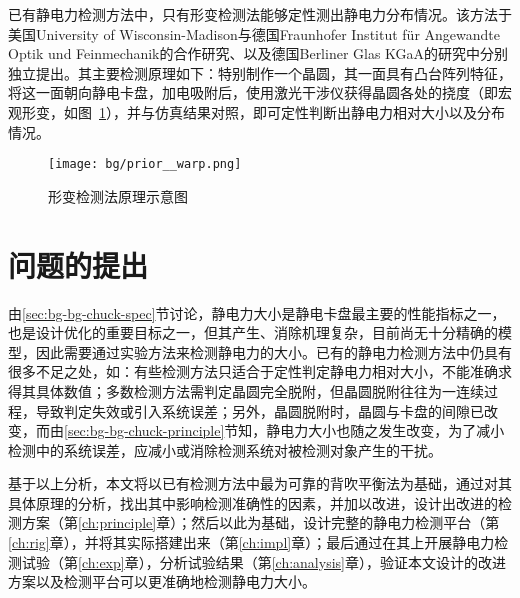已有静电力检测方法中，只有形变检测法能够定性测出静电力分布情况。该方法于美国University of Wisconsin-Madison与德国Fraunhofer Institut für Angewandte Optik und Feinmechanik的合作研究、以及德国Berliner Glas KGaA的研究中分别独立提出。其主要检测原理如下：特别制作一个晶圆，其一面具有凸台阵列特征，将这一面朝向静电卡盘，加电吸附后，使用激光干涉仪获得晶圆各处的挠度（即宏观形变，如图~\ref{fig:bg-prior-warp}），并与仿真结果对照，即可定性判断出静电力相对大小以及分布情况。

\begin{figure}[tbh]
\centering
\texttt{[image: bg/prior\_\_warp.png]}
\caption{形变检测法原理示意图}
\label{fig:bg-prior-warp}
\end{figure}



\section{问题的提出}\label{sec:bg-problem}

由\ref{sec:bg-bg-chuck-spec}节讨论，静电力大小是静电卡盘最主要的性能指标之一，也是设计优化的重要目标之一，但其产生、消除机理复杂，目前尚无十分精确的模型，因此需要通过实验方法来检测静电力的大小。已有的静电力检测方法中仍具有很多不足之处，如：有些检测方法只适合于定性判定静电力相对大小，不能准确求得其具体数值；多数检测方法需判定晶圆完全脱附，但晶圆脱附往往为一连续过程，导致判定失效或引入系统误差；另外，晶圆脱附时，晶圆与卡盘的间隙已改变，而由\ref{sec:bg-bg-chuck-principle}节知，静电力大小也随之发生改变，为了减小检测中的系统误差，应减小或消除检测系统对被检测对象产生的干扰。

基于以上分析，本文将以已有检测方法中最为可靠的背吹平衡法为基础，通过对其具体原理的分析，找出其中影响检测准确性的因素，并加以改进，设计出改进的检测方案（第\ref{ch:principle}章）；然后以此为基础，设计完整的静电力检测平台（第\ref{ch:rig}章），并将其实际搭建出来（第\ref{ch:impl}章）；最后通过在其上开展静电力检测试验（第\ref{ch:exp}章），分析试验结果（第\ref{ch:analysis}章），验证本文设计的改进方案以及检测平台可以更准确地检测静电力大小。